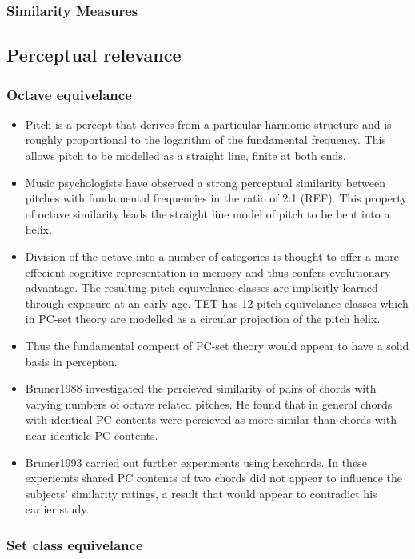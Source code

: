 \documentclass{article}
\begin{document}
\subsubsection{Similarity Measures}
\label{sec-3-4-2}
\subsection{Perceptual relevance}
\label{sec-3-5}
\subsubsection{Octave equivelance}
\label{sec-3-5-1}

\begin{itemize}
\item Pitch is a percept that derives from a particular harmonic structure
  and is roughly proportional to the logarithm of the fundamental
  frequency. This allows pitch to be modelled as a straight line,
  finite at both ends.
\item Music psychologists have observed a strong perceptual similarity
  between pitches with fundamental frequencies in the ratio of 2:1
  (REF). This property of octave similarity leads the straight line
  model of pitch to be bent into a helix.
\item Division of the octave into a number of categories is thought to
  offer a more effecient cognitive representation in memory and thus
  confers evolutionary advantage. The resulting pitch equivelance
  classes are implicitly learned through exposure at an early age. TET
  has 12 pitch equivelance classes which in PC-set theory are modelled
  as a circular projection of the pitch helix.
\item Thus the fundamental compent of PC-set theory would appear to have a
  solid basis in percepton.
\item Bruner1988 investigated the percieved similarity of pairs of chords
  with varying numbers of octave related pitches. He found that in
  general chords with identical PC contents were percieved as more
  similar than chords with near identicle PC contents.
\item Bruner1993 carried out further experiments using hexchords. In these
  experiemts shared PC contents of two chords did not appear to
  influence the subjects' similarity ratings, a result that would
  appear to contradict his earlier study.
\end{itemize}
\subsubsection{Set class equivelance}
\label{sec-3-5-2}
\end{document}

